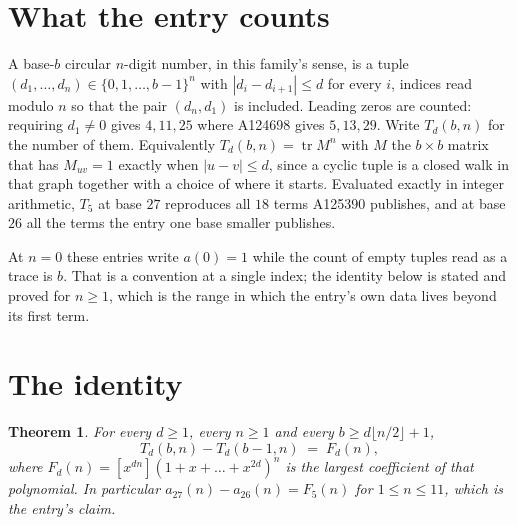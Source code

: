 \documentclass[11pt,a4paper]{article}
\theoremstyle{plain}
\newtheorem{theorem}{Theorem}
\theoremstyle{definition}
\begin{document}
\section{What the entry counts}

A base-$b$ circular $n$-digit number, in this family's sense, is a tuple
$(d_1,\dots,d_n)\in\{0,1,\dots,b-1\}^{n}$ with $|d_i-d_{i+1}|\le d$ for every $i$, indices
read modulo $n$ so that the pair $(d_n,d_1)$ is included. Leading zeros are counted: requiring
$d_1\ne0$ gives $4,11,25$ where A124698 gives $5,13,29$. Write $T_d(b,n)$ for the number of
them. Equivalently $T_d(b,n)=\operatorname{tr}M^{n}$ with $M$ the $b\times b$ matrix that has
$M_{uv}=1$ exactly when $|u-v|\le d$, since a cyclic tuple is a closed walk in that graph
together with a choice of where it starts. Evaluated exactly in integer arithmetic, $T_{5}$
at base $27$ reproduces all $18$ terms A125390 publishes, and at base $26$ all the
terms the entry one base smaller publishes.

At $n=0$ these entries write $a(0)=1$ while the count of empty tuples read as a trace is $b$.
That is a convention at a single index; the identity below is stated and proved for $n\ge1$,
which is the range in which the entry's own data lives beyond its first term.

\section{The identity}

\begin{theorem}
For every $d\ge1$, every $n\ge1$ and every $b\ge d\lfloor n/2\rfloor+1$,
\[
T_d(b,n)-T_d(b-1,n)\;=\;F_d(n),
\]
where $F_d(n)=[x^{dn}](1+x+\dots+x^{2d})^{n}$ is the largest coefficient of that
polynomial. In particular $a_{27}(n)-a_{26}(n)=F_{5}(n)$ for $1\le n\le11$, which
is the entry's claim.
\end{theorem}
\end{document}
